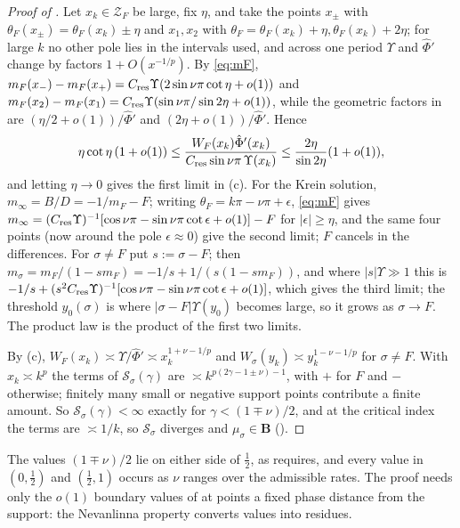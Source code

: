 \begin{proof}[Proof of ]
 Let $x_k\in\mathcal Z_F$ be large, fix $\eta$, and take the points $x_\pm$ with
$\theta_F(x_\pm)=\theta_F(x_k)\pm\eta$ and $x_1,x_2$ with $\theta_F=\theta_F(x_k)+\eta,\theta_F(x_k)+2\eta$; for large $k$ no
other pole lies in the intervals used, and across one period $\Upsilon$ and $\hat\Phi'$ change by
factors $1+O(x^{-1/p})$. By \eqref{eq:mF}, $m_F(x_-)-m_F(x_+)=C_{\mathrm{res}}\Upsilon(2\sin\nu\pi\cot\eta+o(1))$ and
$m_F(x_2)-m_F(x_1)=C_{\mathrm{res}}\Upsilon(\sin\nu\pi/\sin2\eta+o(1))$, while the geometric factors in
 are $(\eta/2+o(1))/\hat\Phi'$ and $(2\eta+o(1))/\hat\Phi'$. Hence
\[
  \eta\cot\eta\,(1+o(1))\le\frac{W_F(x_k)\hat\Phi'(x_k)}{C_{\mathrm{res}}\sin\nu\pi\,\Upsilon(x_k)}\le\frac{2\eta}{\sin2\eta}(1+o(1)),
\]
and letting $\eta\to0$ gives the first limit in (c). For the Krein solution,
$m_\infty=B/D=-1/m_F-F$; writing $\theta_F=k\pi-\nu\pi+\epsilon$, \eqref{eq:mF} gives
$m_\infty=(C_{\mathrm{res}}\Upsilon)^{-1}[\cos\nu\pi-\sin\nu\pi\cot\epsilon+o(1)]-F$ for $|\epsilon|\ge\eta$, and the same four
points (now around the pole $\epsilon\approx0$) give the second limit; $F$ cancels in the
differences. For $\sigma\ne F$ put $s:=\sigma-F$; then $m_\sigma=m_F/(1-sm_F)=-1/s+1/(s(1-sm_F))$, and where
$|s|\Upsilon\gg1$ this is $-1/s+(s^2C_{\mathrm{res}}\Upsilon)^{-1}[\cos\nu\pi-\sin\nu\pi\cot\epsilon+o(1)]$, which gives the third
limit; the threshold $y_0(\sigma)$ is where $|\sigma-F|\Upsilon(y_0)$ becomes large, so it grows as $\sigma\to F$. The
product law is the product of the first two limits.

 By (c), $W_F(x_k)\asymp\Upsilon/\hat\Phi'\asymp x_k^{1+\nu-1/p}$ and
$W_\sigma(y_k)\asymp y_k^{1-\nu-1/p}$ for $\sigma\ne F$. With $x_k\asymp k^p$ the terms of $\mathcal S_\sigma(\gamma)$ are
$\asymp k^{p(2\gamma-1\pm\nu)-1}$, with $+$ for $F$ and $-$ otherwise; finitely many small or negative support
points contribute a finite amount. So $\mathcal S_\sigma(\gamma)<\infty$ exactly for $\gamma<(1\mp\nu)/2$, and at the
critical index the terms are $\asymp1/k$, so $\mathcal S_\sigma$ diverges and $\mu_\sigma\in\mathbf B$
().
\end{proof}

The values $(1\mp\nu)/2$ lie on either side of $\frac12$, as \cite[Thm.~3.8]{BergSzwarc2026} requires,
and every value in $(0,\frac12)$ and $(\frac12,1)$ occurs as $\nu$ ranges over the admissible rates. The
proof needs only the $o(1)$ boundary values of  at points a fixed phase distance from
the support: the Nevanlinna property converts values into residues.

